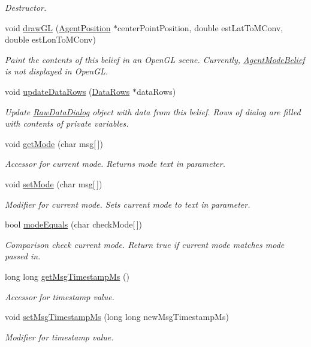 \begin{DoxyCompactItemize}
\begin{DoxyCompactList}\small\item\em Destructor. \end{DoxyCompactList}\item 
void \hyperlink{class_agent_mode_belief_affc67b173b75fcb310b2c344ee64b6ee}{drawGL} (\hyperlink{class_agent_position}{AgentPosition} $\ast$centerPointPosition, double estLatToMConv, double estLonToMConv)
\begin{DoxyCompactList}\small\item\em Paint the contents of this belief in an OpenGL scene. Currently, \hyperlink{class_agent_mode_belief}{AgentModeBelief} is not displayed in OpenGL. \end{DoxyCompactList}\item 
void \hyperlink{class_agent_mode_belief_a96d89f34b7d27bb5e90b4c5e78cc0c38}{updateDataRows} (\hyperlink{struct_data_rows}{DataRows} $\ast$dataRows)
\begin{DoxyCompactList}\small\item\em Update \hyperlink{class_raw_data_dialog}{RawDataDialog} object with data from this belief. Rows of dialog are filled with contents of private variables. \end{DoxyCompactList}\item 
void \hyperlink{class_agent_mode_belief_ab25cfceb40d3012dc8f8f7b4ba03d011}{getMode} (char msg\mbox{[}$\,$\mbox{]})
\begin{DoxyCompactList}\small\item\em Accessor for current mode. Returns mode text in parameter. \end{DoxyCompactList}\item 
void \hyperlink{class_agent_mode_belief_a3412415eb43a76689a5d8f4ff9ff7f38}{setMode} (char msg\mbox{[}$\,$\mbox{]})
\begin{DoxyCompactList}\small\item\em Modifier for current mode. Sets current mode to text in parameter. \end{DoxyCompactList}\item 
bool \hyperlink{class_agent_mode_belief_aa81eb9d01eb75a4513c8532bc9b6dff9}{modeEquals} (char checkMode\mbox{[}$\,$\mbox{]})
\begin{DoxyCompactList}\small\item\em Comparison check current mode. Return true if current mode matches mode passed in. \end{DoxyCompactList}\item 
long long \hyperlink{class_agent_mode_belief_a85712eb1af408ac5505387c47659875b}{getMsgTimestampMs} ()
\begin{DoxyCompactList}\small\item\em Accessor for timestamp value. \end{DoxyCompactList}\item 
void \hyperlink{class_agent_mode_belief_a6f538e8560045eb16f9c9ccf79693667}{setMsgTimestampMs} (long long newMsgTimestampMs)
\begin{DoxyCompactList}\small\item\em Modifier for timestamp value. \end{DoxyCompactList}\end{DoxyCompactItemize}
